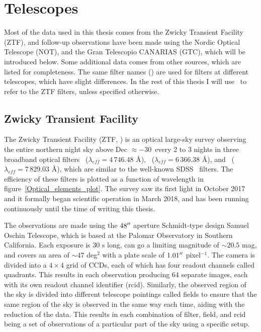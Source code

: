 \documentclass[a4paper,oneside,12pt, class=Latex/Classes/PhDthesisPSnPDF, crop=false]{standalone}
\begin{document}
\section{Telescopes}
\label{telescopes}
Most of the data used in this thesis comes from the Zwicky Transient Facility (ZTF), and follow-up observations have been made using the Nordic Optical Telescope (NOT), and the Gran Telescopio CANARIAS (GTC), which will be introduced below. Some additional data comes from other sources, which are listed for completeness. The same filter names (\ztfg\ztfr\ztfi) are used for filters at different telescopes, which have slight differences. In the rest of this thesis I will use \ztfg\ztfr\ztfi\ to refer to the ZTF filters, unless specified otherwise.

\subsection{Zwicky Transient Facility}
\label{ZTF}
The Zwicky Transient Facility (ZTF, \citealt{ZTF_Surveys_Scheduler, ZTF_overview_and_1st_results, ZTF_Science_Objectives, ZTF_Instrumentation, ZTF_Observing_System}) is an optical large-sky survey observing the entire northern night sky above Dec $\approx -30$\degree\ every 2 to 3 nights in three broadband optical filters \ztfg~($\lambda_{eff} = 4\,746.48$ \AA), \ztfr~($\lambda_{eff} = 6\,366.38$ \AA), and \ztfi~($\lambda_{eff} = 7\,829.03$ \AA), which are similar to the well-known SDSS \ztfg\ztfr\ztfi\ filters. The efficiency of these filters is plotted as a function of wavelength in figure~\ref{Optical_elements_plot}. The survey saw its first light in October 2017 and it formally began scientific operation in March 2018, and has been running continuously until the time of writing this thesis.

The observations are made using the $48^{\prime\prime}$ aperture Schmidt-type design Samuel Oschin Telescope, which is based at the Palomar Observatory in Southern California. Each exposure is 30 s long, can go a limiting magnitude of $\sim20.5$ mag, and covers an area of $\sim47$ deg$^2$ with a plate scale of $1.01^{\prime\prime}$ pixel$^{-1}$. The camera is divided into a $4\times4$ grid of CCDs, each of which has four readout channels called quadrants. This results in each observation producing 64 separate images, each with its own readout channel identifier (rcid). Similarly, the observed region of the sky is divided into different telescope pointings called fields to ensure that the same region of the sky is observed in the same way each time, aiding with the reduction of the data. This results in each combination of filter, field, and rcid being a set of observations of a particular part of the sky using a specific setup.
\end{document}

